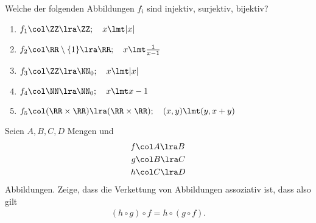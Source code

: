 \begin{aufg}
  Welche der folgenden Abbildungen $f_{i}$ sind injektiv, surjektiv, bijektiv?
  \begin{enumerate}
    \item $f_{1}\col\ZZ \lra \ZZ;\quad x \lmt |x|$
    \item $f_{2}\col\RR\setminus\{1\} \lra \RR;\quad x \lmt \frac{1}{x - 1}$
    \item $f_{3}\col\ZZ \lra \NN_{0};\quad x \lmt |x|$
    \item $f_{4}\col\NN \lra \NN_{0}; \quad x \lmt x-1$
    \item $f_{5}\col(\RR\times\RR) \lra (\RR\times\RR);\quad (x,y) \lmt (y,x+y)$
  \end{enumerate}
\end{aufg}


\begin{aufg}

  Seien $A,B,C,D$ Mengen und 
  \begin{align*}
    f \col &A \lra B \\
    g \col &B \lra C \\
    h \col &C \lra D
  \end{align*}
  Abbildungen. Zeige, dass die Verkettung von Abbildungen assoziativ ist,
  dass also gilt
  \begin{align*}
    (h \circ g)\circ f = h \circ (g \circ f).
  \end{align*}
  
\end{aufg}







